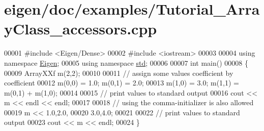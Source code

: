 \hypertarget{eigen_2doc_2examples_2_tutorial___array_class__accessors_8cpp_source}{}\section{eigen/doc/examples/\+Tutorial\+\_\+\+Array\+Class\+\_\+accessors.cpp}
\label{eigen_2doc_2examples_2_tutorial___array_class__accessors_8cpp_source}

\begin{DoxyCode}
00001 \textcolor{preprocessor}{#include <Eigen/Dense>}
00002 \textcolor{preprocessor}{#include <iostream>}
00003 
00004 \textcolor{keyword}{using namespace }\hyperlink{namespace_eigen}{Eigen};
00005 \textcolor{keyword}{using namespace }\hyperlink{namespacestd}{std};
00006 
00007 \textcolor{keywordtype}{int} main()
00008 \{
00009   ArrayXXf  m(2,2);
00010   
00011   \textcolor{comment}{// assign some values coefficient by coefficient}
00012   m(0,0) = 1.0; m(0,1) = 2.0;
00013   m(1,0) = 3.0; m(1,1) = m(0,1) + m(1,0);
00014   
00015   \textcolor{comment}{// print values to standard output}
00016   cout << m << endl << endl;
00017  
00018   \textcolor{comment}{// using the comma-initializer is also allowed}
00019   m << 1.0,2.0,
00020        3.0,4.0;
00021      
00022   \textcolor{comment}{// print values to standard output}
00023   cout << m << endl;
00024 \}
\end{DoxyCode}
